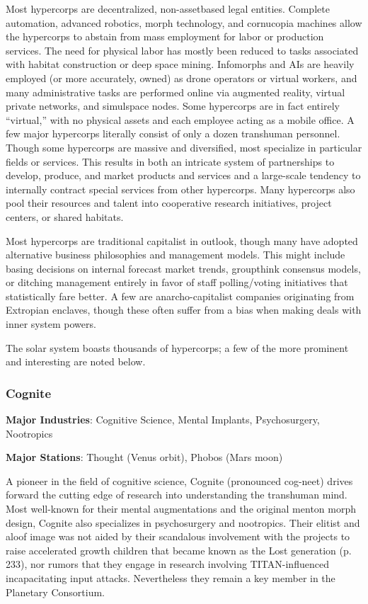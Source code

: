 Most hypercorps are decentralized, non-assetbased legal
entities. Complete automation, advanced robotics, morph technology,
and cornucopia machines allow the hypercorps to abstain from mass
employment for labor or production services. The need for physical
labor has mostly been reduced to tasks associated with habitat
construction or deep space mining. Infomorphs and AIs are heavily
employed (or more accurately, owned) as drone operators or virtual
workers, and many administrative tasks are performed online via
augmented reality, virtual private networks, and simulspace nodes.
Some hypercorps are in fact entirely “virtual,” with no physical
assets and each employee acting as a mobile office. A few major
hypercorps literally consist of only a dozen transhuman
personnel. Though some hypercorps are massive and diversified, most
specialize in particular fields or services. This results in both an
intricate system of partnerships to develop, produce, and market
products and services and a large-scale tendency to internally
contract special services from other hypercorps. Many hypercorps also
pool their resources and talent into cooperative research initiatives,
project centers, or shared habitats.

Most hypercorps are traditional capitalist in outlook, though many
have adopted alternative business philosophies and management
models. This might include basing decisions on internal forecast
market trends, groupthink consensus models, or ditching management
entirely in favor of staff polling/voting initiatives that
statistically fare better. A few are anarcho-capitalist companies
originating from Extropian enclaves, though these often suffer from a
bias when making deals with inner system powers.

The solar system boasts thousands of hypercorps; a few of the more
prominent and interesting are noted below.

\subsubsection{Cognite}
\label{sec:cognite}

\textbf{Major Industries}: Cognitive Science, Mental Implants,
Psychosurgery, Nootropics

\textbf{Major Stations}: Thought (Venus orbit), Phobos (Mars moon)


A pioneer in the field of cognitive science, Cognite (pronounced
cog-neet) drives forward the cutting edge of research into
understanding the transhuman mind. Most well-known for their mental
augmentations and the original menton morph design, Cognite also
specializes in psychosurgery and nootropics.  Their elitist and aloof
image was not aided by their scandalous involvement with the projects
to raise accelerated growth children that became known as the Lost
generation (p. 233), nor rumors that they engage in research involving
TITAN-influenced incapacitating input attacks. Nevertheless they
remain a key member in the Planetary Consortium.


